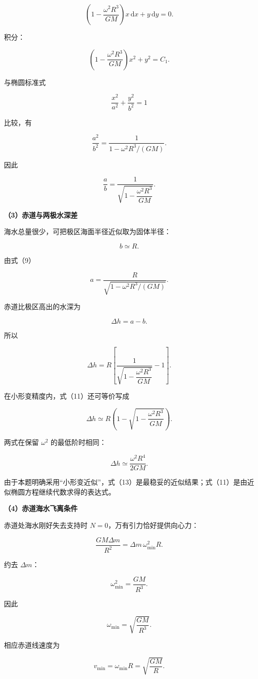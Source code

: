 \documentclass[12pt,a4paper,UTF8]{ctexart}
\begin{document}
\[
\left(1-\frac{\omega^2R^3}{GM}\right)x\,\mathrm dx
+y\,\mathrm dy=0.
\tag{7}
\]

积分：

\[
\left(1-\frac{\omega^2R^3}{GM}\right)x^2+y^2=C_1.
\tag{8}
\]

与椭圆标准式

\[
\frac{x^2}{a^2}+\frac{y^2}{b^2}=1
\]

比较，有

\[
\frac{a^2}{b^2}
=\frac1{1-\omega^2R^3/(GM)}.
\]

因此

\[
\boxed{
\frac ab
=\frac1{\sqrt{1-\dfrac{\omega^2R^3}{GM}}}
}.
\tag{9}
\]

\textbf{（3）赤道与两极水深差}

海水总量很少，可把极区海面半径近似取为固体半径：

\[
b\simeq R.
\tag{10}
\]

由式（9）

\[
a=\frac{R}{\sqrt{1-\omega^2R^3/(GM)}}.
\]

赤道比极区高出的水深为

\[
\Delta h=a-b.
\]

所以

\[
\boxed{
\Delta h
=R\left[
\frac1{\sqrt{1-\dfrac{\omega^2R^3}{GM}}}-1
\right]
}.
\tag{11}
\]

在小形变精度内，式（11）还可等价写成

\[
\Delta h
\simeq R\left(1-\sqrt{1-\frac{\omega^2R^3}{GM}}\right).
\tag{12}
\]

两式在保留 \(\omega^2\) 的最低阶时相同：

\[
\Delta h\simeq\frac{\omega^2R^4}{2GM}.
\tag{13}
\]

由于本题明确采用``小形变近似''，式（13）是最稳妥的近似结果；式（11）是由近似椭圆方程继续代数求得的表达式。

\textbf{（4）赤道海水飞离条件}

赤道处海水刚好失去支持时 \(N=0\)，万有引力恰好提供向心力：

\[
\frac{GM\Delta m}{R^2}
=\Delta m\,\omega_{\min}^2R.
\]

约去 \(\Delta m\)：

\[
\omega_{\min}^2=\frac{GM}{R^3}.
\]

因此

\[
\boxed{
\omega_{\min}=\sqrt{\frac{GM}{R^3}}
}.
\tag{14}
\]

相应赤道线速度为

\[
v_{\min}=\omega_{\min}R
=\sqrt{\frac{GM}{R}}.
\tag{15}
\]
\end{document}
